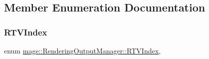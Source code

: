 \subsection{Member Enumeration Documentation}
\hypertarget{classmage_1_1_rendering_output_manager_aebe136819797593f0fcf53b753e9c3ce}{}\label{classmage_1_1_rendering_output_manager_aebe136819797593f0fcf53b753e9c3ce} 
\subsubsection{\texorpdfstring{R\+T\+V\+Index}{RTVIndex}}
{\footnotesize\ttfamily enum \hyperlink{classmage_1_1_rendering_output_manager_aebe136819797593f0fcf53b753e9c3ce}{mage\+::\+Rendering\+Output\+Manager\+::\+R\+T\+V\+Index}\hspace{0.3cm}{\ttfamily [strong]}, {\ttfamily [private]}}


